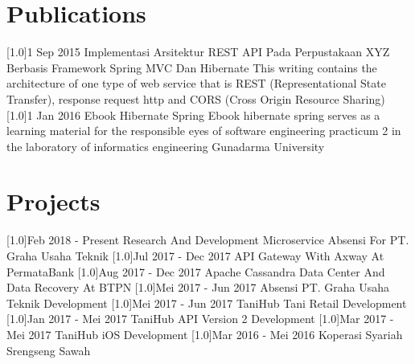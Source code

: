 \documentclass[english]{cv-style}
\begin{document}
\section{Publications}
\vspace{-0.2cm}
\begin{entrylist}
\entry
{\scalebox{.8}[1.0]{1 Sep 2015}}
{Implementasi Arsitektur REST API Pada Perpustakaan XYZ Berbasis Framework Spring MVC Dan Hibernate}
{}
{This writing contains the architecture of one type of web service that is REST (Representational State Transfer), response request http and CORS (Cross Origin Resource Sharing)}
\entry
{\scalebox{.8}[1.0]{1 Jan 2016}}
{Ebook Hibernate Spring}
{}
{Ebook hibernate spring serves as a learning material for the responsible eyes of software engineering practicum 2 in the laboratory of informatics engineering Gunadarma University}
\end{entrylist}

\section{Projects}
\vspace{-0.3cm}
\begin{entrylist}
\entry
{\scalebox{.6}[1.0]{Feb 2018 - Present}}
{Research And Development Microservice Absensi For PT. Graha Usaha Teknik}
{}
{}
\entry
{\scalebox{.6}[1.0]{Jul 2017 - Dec 2017}}
{API Gateway With Axway At PermataBank}
{}
{}
\entry
{\scalebox{.6}[1.0]{Aug 2017 - Dec 2017}}
{Apache Cassandra Data Center And Data Recovery At BTPN}
{}
{}
\entry
{\scalebox{.6}[1.0]{Mei 2017 - Jun 2017}}
{Absensi PT. Graha Usaha Teknik Development}
{}
{}
\entry
{\scalebox{.6}[1.0]{Mei 2017 - Jun 2017}}
{TaniHub Tani Retail Development}
{}
{}
\entry
{\scalebox{.6}[1.0]{Jan 2017 - Mei 2017}}
{TaniHub API Version 2 Development}
{}
{}
\entry
{\scalebox{.6}[1.0]{Mar 2017 - Mei 2017}}
{TaniHub iOS Development}
{}
{}
\entry
{\scalebox{.6}[1.0]{Mar 2016 - Mei 2016}}
{Koperasi Syariah Srengseng Sawah}
{}
{}
\end{entrylist}
\end{document}
